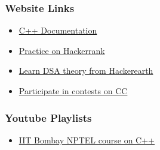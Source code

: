 \documentclass[12pt]{beamer}
\begin{document}
   
\begin {frame}
    \frametitle {Website Links}
    \begin {itemize} 
             
        \item \href {https://devdocs.io/cpp/}{C++ Documentation}
        \item \href {https://www.hackerrank.com/domains/cpp}{Practice on Hackerrank}
        \item \href {https://www.hackerearth.com/practice/}{Learn DSA theory from Hackerearth}
        \item \href {https://www.codechef.com/}{Participate in contests on CC} 
             
    \end {itemize}        
\end {frame}
   
\begin {frame}
    \frametitle {Youtube Playlists}
    \begin {itemize}          
        \item \href {https://www.youtube.com/playlist?list=PLOzRYVm0a65eklyMDXGSWObRA-7lCdkSm}{IIT Bombay NPTEL course on C++}
             
    \end {itemize}       
\end {frame}

\end{document}
